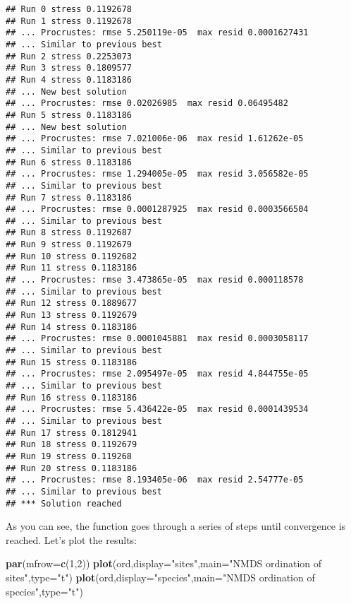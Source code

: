 \documentclass[
]{book}
\newenvironment{Shaded}{\begin{snugshade}}{\end{snugshade}}
\newcommand{\DataTypeTok}[1]{\textcolor[rgb]{0.13,0.29,0.53}{#1}}
\newcommand{\DecValTok}[1]{\textcolor[rgb]{0.00,0.00,0.81}{#1}}
\newcommand{\KeywordTok}[1]{\textcolor[rgb]{0.13,0.29,0.53}{\textbf{#1}}}
\newcommand{\NormalTok}[1]{#1}
\newcommand{\StringTok}[1]{\textcolor[rgb]{0.31,0.60,0.02}{#1}}
\begin{document}
\begin{verbatim}
## Run 0 stress 0.1192678 
## Run 1 stress 0.1192678 
## ... Procrustes: rmse 5.250119e-05  max resid 0.0001627431 
## ... Similar to previous best
## Run 2 stress 0.2253073 
## Run 3 stress 0.1809577 
## Run 4 stress 0.1183186 
## ... New best solution
## ... Procrustes: rmse 0.02026985  max resid 0.06495482 
## Run 5 stress 0.1183186 
## ... New best solution
## ... Procrustes: rmse 7.021006e-06  max resid 1.61262e-05 
## ... Similar to previous best
## Run 6 stress 0.1183186 
## ... Procrustes: rmse 1.294005e-05  max resid 3.056582e-05 
## ... Similar to previous best
## Run 7 stress 0.1183186 
## ... Procrustes: rmse 0.0001287925  max resid 0.0003566504 
## ... Similar to previous best
## Run 8 stress 0.1192687 
## Run 9 stress 0.1192679 
## Run 10 stress 0.1192682 
## Run 11 stress 0.1183186 
## ... Procrustes: rmse 3.473865e-05  max resid 0.000118578 
## ... Similar to previous best
## Run 12 stress 0.1889677 
## Run 13 stress 0.1192679 
## Run 14 stress 0.1183186 
## ... Procrustes: rmse 0.0001045881  max resid 0.0003058117 
## ... Similar to previous best
## Run 15 stress 0.1183186 
## ... Procrustes: rmse 2.095497e-05  max resid 4.844755e-05 
## ... Similar to previous best
## Run 16 stress 0.1183186 
## ... Procrustes: rmse 5.436422e-05  max resid 0.0001439534 
## ... Similar to previous best
## Run 17 stress 0.1812941 
## Run 18 stress 0.1192679 
## Run 19 stress 0.119268 
## Run 20 stress 0.1183186 
## ... Procrustes: rmse 8.193405e-06  max resid 2.54777e-05 
## ... Similar to previous best
## *** Solution reached
\end{verbatim}

As you can see, the function goes through a series of steps until convergence is reached. Let's plot the results:

\begin{Shaded}
\begin{Highlighting}[]
\KeywordTok{par}\NormalTok{(}\DataTypeTok{mfrow=}\KeywordTok{c}\NormalTok{(}\DecValTok{1}\NormalTok{,}\DecValTok{2}\NormalTok{))}
\KeywordTok{plot}\NormalTok{(ord,}\DataTypeTok{display=}\StringTok{"sites"}\NormalTok{,}\DataTypeTok{main=}\StringTok{"NMDS ordination of sites"}\NormalTok{,}\DataTypeTok{type=}\StringTok{"t"}\NormalTok{)}
\KeywordTok{plot}\NormalTok{(ord,}\DataTypeTok{display=}\StringTok{"species"}\NormalTok{,}\DataTypeTok{main=}\StringTok{"NMDS ordination of species"}\NormalTok{,}\DataTypeTok{type=}\StringTok{"t"}\NormalTok{)}
\end{Highlighting}
\end{Shaded}
\end{document}
